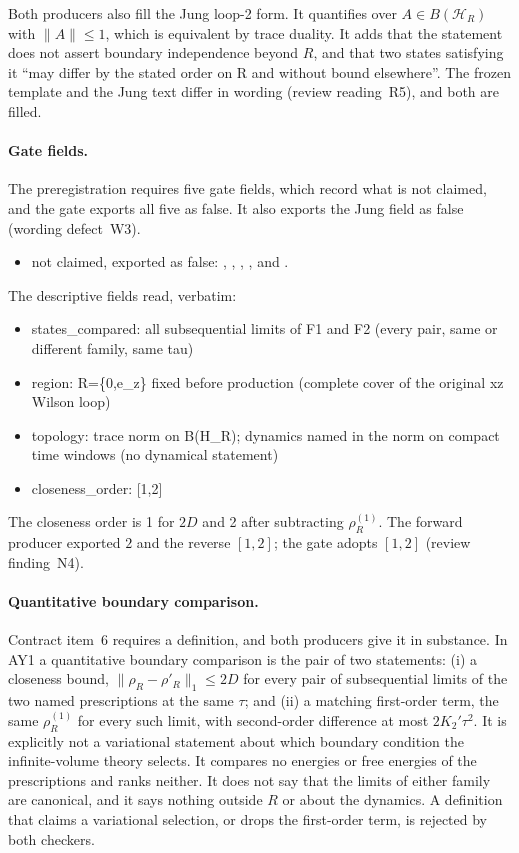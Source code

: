 Both producers also fill the Jung loop-2 form. It quantifies over
$A\in B(\mathcal H_R)$ with $\lVert A\rVert \le1$, which is equivalent by trace
duality. It adds that the statement does not assert boundary independence
beyond $R$, and that two states satisfying it ``may differ by the stated order
on R and without bound elsewhere''. The frozen template and the Jung text
differ in wording (review reading~R5), and both are filled.

\paragraph{Gate fields.}
The preregistration requires five gate fields, which record what is not
claimed, and the gate exports all five as false. It also exports the Jung
field  as false (wording defect~W3).
\begin{itemize}\raggedright
\item not claimed, exported as false: ,
 , ,
 ,
  and
 .
\end{itemize}
The descriptive fields read, verbatim:
\begin{gatequote}
\begin{itemize}
\item states\_compared: all subsequential limits of F1 and F2 (every pair,
same or different family, same tau)
\item region: R=\{0,e\_z\} fixed before production (complete cover of the
original xz Wilson loop)
\item topology: trace norm on B(H\_R); dynamics named in the norm on compact
time windows (no dynamical statement)
\item closeness\_order: [1,2]
\end{itemize}
\end{gatequote}
The closeness order is 1 for $2D$ and 2 after subtracting $\rho^{(1)}_R$. The
forward producer exported $2$ and the reverse $[1,2]$; the gate adopts
$[1,2]$ (review finding~N4).

\paragraph{Quantitative boundary comparison.}
Contract item~6 requires a definition, and both producers give it in
substance. In AY1 a quantitative boundary comparison is the pair of two
statements: (i) a closeness bound, $\lVert \rho_R-\rho'_R\rVert_1\le2D$ for every
pair of subsequential limits of the two named prescriptions at the same
$\tau$; and (ii) a matching first-order term, the same $\rho^{(1)}_R$ for
every such limit, with second-order difference at most $2K_2'\tau^2$. It is
explicitly not a variational statement about which boundary condition the
infinite-volume theory selects. It compares no energies or free energies of
the prescriptions and ranks neither. It does not say that the limits of
either family are canonical, and it says nothing outside $R$ or about the
dynamics. A definition that claims a variational selection, or drops the
first-order term, is rejected by both checkers.

